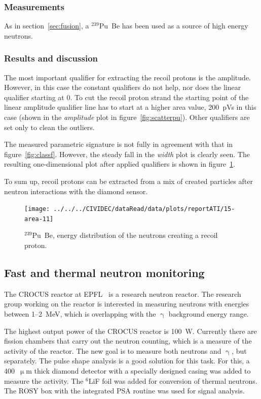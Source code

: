 \subsubsection{Measurements}
As in section~\ref{sec:fusion}, a $^{239}$Pu~Be has been used as a source of high energy neutrons.
\subsubsection{Results and discussion}
The most important qualifier for extracting the recoil protons is the amplitude. However, in this case the constant qualifiers do not help, nor does the linear qualifier starting at 0. To cut the recoil proton strand the starting point of the linear amplitude qualifier line has to start at a higher area value, 200~pVs in this case (shown in the \emph{amplitude} plot in figure~\ref{fig:scatterpu}). Other qualifiers are set only to clean the outliers.

The measured parametric signature is not fully in agreement with that in figure~\ref{fig:classf}. However, the steady fall in the \emph{width} plot is clearly seen. The resulting one-dimensional plot after applied qualifiers is shown in figure~\ref{fig:scatterpuarea}. 

To sum up, recoil protons can be extracted from a mix of created particles after neutron interactions with the diamond sensor.



\begin{figure}[!t]
\centering
\texttt{[image: ../../../CIVIDEC/dataRead/data/plots/reportATI/15-area-11]}
\caption{$^{239}$Pu~Be, energy distribution of the neutrons creating a recoil proton.}
\label{fig:scatterpuarea}
\end{figure}








\clearpage
\subsection{Fast and thermal neutron monitoring}
The CROCUS reactor at EPFL~\cite{EPFL:00000} is a research neutron reactor. The research group working on the reactor is interested in measuring neutrons with energies between 1--2~MeV, which is overlapping with the $\upgamma$ background energy range.

The highest output power of the CROCUS reactor is 100~W. Currently there are fission chambers that carry out the neutron counting, which is a measure of the activity of the reactor. The new goal is to measure both neutrons and $\upgamma$, but separately. The pulse shape analysis is a good solution for this task. For this, a 400~$\upmu$m thick diamond detector with a specially designed casing was added to measure the activity. The $^6$LiF foil was added for conversion of thermal neutrons. The ROSY box with the integrated PSA routine was used for signal analysis.


